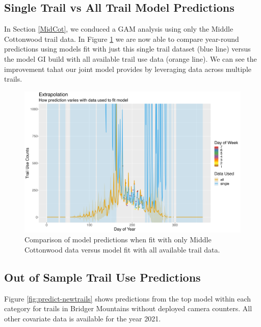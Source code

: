 \documentclass[
]{book}
\begin{document}
\hypertarget{single-trail-vs-all-trail-model-predictions}{%
\subsection{Single Trail vs All Trail Model Predictions}\label{single-trail-vs-all-trail-model-predictions}}

In Section \ref{MidCot}, we conduced a GAM analysis using only the Middle Cottonwood trail data. In Figure \ref{fig:compareMC} we are now able to compare year-round predictions using models fit with just this single trail dataset (blue line) versus the model GI build with all available trail use data (orange line). We can see the improvement tahat our joint model provides by leveraging data across multiple trails.

\begin{figure}

{\centering \includegraphics[width=1\linewidth]{../figures/MC_data_used} 

}

\caption{Comparison of model predictions when fit with only Middle Cottonwood data versus model fit with all available trail data.}\label{fig:compareMC}
\end{figure}

\hypertarget{out-of-sample-trail-use-predictions}{%
\subsection{Out of Sample Trail Use Predictions}\label{out-of-sample-trail-use-predictions}}

Figure \ref{fig:predict-newtrails} shows predictions from the top model within each category for trails in Bridger Mountains without deployed camera counters. All other covariate data is available for the year 2021.
\end{document}
